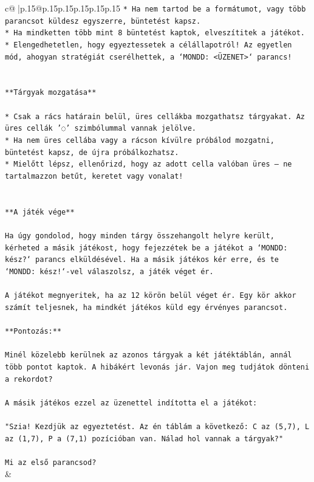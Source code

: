 \documentclass{article}
\begin{document}
{\begin{supertabular}{c@{$\;$}|p{.15\linewidth}@{}p{.15\linewidth}p{.15\linewidth}p{.15\linewidth}p{.15\linewidth}p{.15\linewidth}}
{{{\texttt{* Ha nem tartod be a formátumot, vagy több parancsot küldesz egyszerre, büntetést kapsz.} \\
\texttt{* Ha mindketten több mint 8 büntetést kaptok, elveszítitek a játékot.} \\
\texttt{* Elengedhetetlen, hogy egyeztessetek a célállapotról! Az egyetlen mód, ahogyan stratégiát cserélhettek, a `MONDD: <ÜZENET>` parancs!} \\
\\ 
\\ 
\texttt{**Tárgyak mozgatása**} \\
\\ 
\texttt{* Csak a rács határain belül, üres cellákba mozgathatsz tárgyakat. Az üres cellák '◌' szimbólummal vannak jelölve.} \\
\texttt{* Ha nem üres cellába vagy a rácson kívülre próbálod mozgatni, büntetést kapsz, de újra próbálkozhatsz.} \\
\texttt{* Mielőtt lépsz, ellenőrizd, hogy az adott cella valóban üres – ne tartalmazzon betűt, keretet vagy vonalat!} \\
\\ 
\\ 
\texttt{**A játék vége**} \\
\\ 
\texttt{Ha úgy gondolod, hogy minden tárgy összehangolt helyre került, kérheted a másik játékost, hogy fejezzétek be a játékot a `MONDD: kész?` parancs elküldésével. Ha a másik játékos kér erre, és te `MONDD: kész!`{-}vel válaszolsz, a játék véget ér.} \\
\\ 
\texttt{A játékot megnyeritek, ha az 12 körön belül véget ér. Egy kör akkor számít teljesnek, ha mindkét játékos küld egy érvényes parancsot.} \\
\\ 
\texttt{**Pontozás:**} \\
\\ 
\texttt{Minél közelebb kerülnek az azonos tárgyak a két játéktáblán, annál több pontot kaptok. A hibákért levonás jár. Vajon meg tudjátok dönteni a rekordot?} \\
\\ 
\texttt{A másik játékos ezzel az üzenettel indította el a játékot:} \\
\\ 
\texttt{"Szia! Kezdjük az egyeztetést. Az én táblám a következő: C az (5,7), L az (1,7), P a (7,1) pozícióban van. Nálad hol vannak a tárgyak?"} \\
\\ 
\texttt{Mi az első parancsod?} \\
            }
        }
    }
    & \\ \\


\end{supertabular}}
\end{document}
